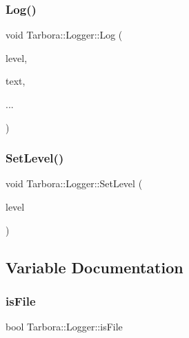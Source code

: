 \mbox{\label{namespaceTarbora_1_1Logger_aa32641fca455178d88f3b1c8b2f552ab}} 
\subsubsection{\texorpdfstring{Log()}{Log()}}
{\footnotesize\ttfamily void Tarbora\+::\+Logger\+::\+Log (\begin{DoxyParamCaption}\item[{\hyperlink{namespaceTarbora_1_1Logger_a0596faea258f2da51ad7ca3abd806be3}{Log\+Level}}]{level,  }\item[{const char $\ast$}]{text,  }\item[{}]{... }\end{DoxyParamCaption})}

\mbox{\label{namespaceTarbora_1_1Logger_af2a11244236bad59fce9cc6a1360af29}} 
\subsubsection{\texorpdfstring{Set\+Level()}{SetLevel()}}
{\footnotesize\ttfamily void Tarbora\+::\+Logger\+::\+Set\+Level (\begin{DoxyParamCaption}\item[{\hyperlink{namespaceTarbora_1_1Logger_a0596faea258f2da51ad7ca3abd806be3}{Log\+Level}}]{level }\end{DoxyParamCaption})}



\subsection{Variable Documentation}
\mbox{\label{namespaceTarbora_1_1Logger_acff3c742b3666af3ef346d208a35db80}} 
\subsubsection{\texorpdfstring{is\+File}{isFile}}
{\footnotesize\ttfamily bool Tarbora\+::\+Logger\+::is\+File}


